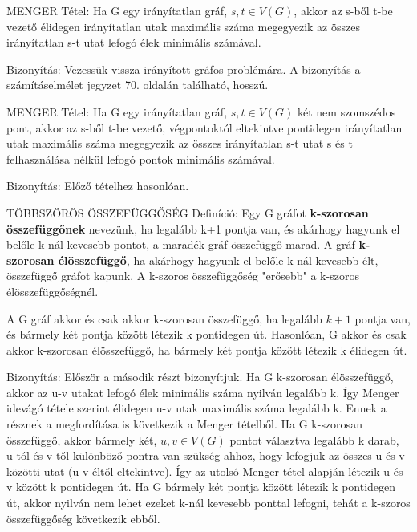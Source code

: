 \documentclass[]{article}
\begin{document}
\begin{framed}
MENGER Tétel: Ha G egy irányítatlan gráf, $s,t\in V(G)$, akkor az s-ből t-be vezető élidegen irányítatlan utak maximális száma megegyezik az összes irányítatlan s-t utat lefogó élek minimális számával.
\end{framed}
\begin{leftbar}
Bizonyítás: Vezessük vissza irányított gráfos problémára. A bizonyítás a számításelmélet jegyzet 70. oldalán található, hosszú.
\end{leftbar}
\begin{framed}
MENGER Tétel: Ha G egy irányítatlan gráf, $s,t\in V(G)$ két nem szomszédos pont, akkor az s-ből t-be vezető, végpontoktól eltekintve pontidegen irányítatlan utak maximális száma megegyezik az összes irányítatlan s-t utat s és t felhasználása nélkül lefogó pontok minimális számával.
\end{framed}
\begin{leftbar}
Bizonyítás: Előző tételhez hasonlóan.
\end{leftbar}
\begin{shaded}
TÖBBSZÖRÖS ÖSSZEFÜGGŐSÉG Definíció: Egy G gráfot \textbf{k-szorosan összefüggőnek} nevezünk, ha legalább k+1 pontja van, és akárhogy hagyunk el belőle k-nál kevesebb pontot, a maradék gráf összefüggő marad. A gráf \textbf{k-szorosan élösszefüggő}, ha akárhogy hagyunk el belőle k-nál kevesebb élt, összefüggő gráfot kapunk. A k-szoros összefüggőség "erősebb" a k-szoros élösszefüggőségnél.
\end{shaded}
\begin{framed}
A G gráf akkor és csak akkor k-szorosan összefüggő, ha legalább $k + 1$ pontja van, és bármely két pontja között létezik k pontidegen út. Hasonlóan, G akkor és csak akkor k-szorosan élösszefüggő, ha bármely két pontja között létezik k élidegen út.
\end{framed}
\begin{leftbar}
Bizonyítás: Először a második részt bizonyítjuk. Ha G k-szorosan élösszefüggő, akkor az u-v utakat lefogó élek minimális száma nyilván legalább k. Így Menger idevágó tétele szerint élidegen u-v utak maximális száma legalább k. Ennek a résznek a megfordítása is következik a Menger tételből. Ha G k-szorosan összefüggő, akkor bármely két, $u,v\in V(G)$ pontot választva legalább k darab, u-tól és v-től különböző pontra van szükség ahhoz, hogy lefogjuk az összes u és v közötti utat (u-v éltől eltekintve). Így az utolsó Menger tétel alapján létezik u és v között k pontidegen út. Ha G bármely két pontja között létezik k pontidegen út, akkor nyilván nem lehet ezeket k-nál kevesebb ponttal lefogni, tehát a k-szoros összefüggőség következik ebből.
\end{leftbar}
\end{document}
